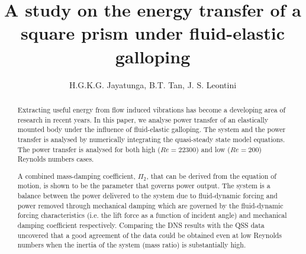 \documentclass[preprint,authoryear,12pt]{elsarticle}
\newcommand{\reynoldsnumber}{\ensuremath{Re}}
\newcommand{\massdamp}{\ensuremath{\Pi_2}}
\begin{document}
\begin{frontmatter}



\title{A study on the energy transfer of a square prism under fluid-elastic galloping}


\author{H.G.K.G. Jayatunga, B.T. Tan, J. S. Leontini}

\address{}

\begin{abstract}
Extracting useful energy from flow induced vibrations has become a developing area of research in recent years. In this paper, we analyse power transfer of an elastically mounted body under the influence of fluid-elastic galloping. The system and the power transfer is analysed by numerically integrating the quasi-steady state model equations. The power transfer is analysed for both high ($\reynoldsnumber=22300$) and low ($\reynoldsnumber=200$) Reynolds numbers cases.

 A combined mass-damping coefficient, \massdamp, that can be derived from the equation of motion, is shown to be the parameter that governs power output. The system is a balance between the power delivered to the system due to fluid-dynamic forcing and power removed through mechanical damping which are governed by the fluid-dynamic forcing characteristics (i.e. the lift force as a function of incident angle) and mechanical damping coefficient respectively. Comparing the DNS results with the QSS data  uncovered that a good agreement of the data could be obtained even at low Reynolds numbers when the inertia of the system (mass ratio) is substantially high.    



\end{abstract}

\begin{keyword}


\end{keyword}

\end{frontmatter}
\end{document}
